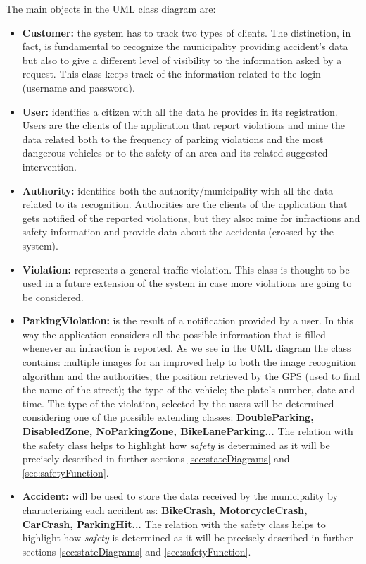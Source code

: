 	The main objects in the UML class diagram are:
	\begin{itemize}
		\item \textbf{Customer:} the system has to track two types of clients. The distinction, in fact, is fundamental to recognize the municipality providing accident's data but also to give a different level of visibility to the information asked by a request. This class keeps track of the information related to the login (username and password).
		
		\item \textbf{User:} identifies a citizen with all the data he provides in its registration. Users are the clients of the application that report violations and mine the data related both to the frequency of parking violations and the most dangerous vehicles or to the safety of an area and its related suggested intervention.
		
		\item \textbf{Authority:} identifies both the authority/municipality with all the data related to its recognition. Authorities are the clients of the application that gets notified of the reported violations, but they also: mine for infractions and safety information and provide data about the accidents (crossed by the system).
		
		\item \textbf{Violation:} represents a general traffic violation. This class is thought to be used in a future extension of the system in case more violations are going to be considered.
		
		\item \textbf{ParkingViolation:} is the result of a notification provided by a user. In this way the application considers all the possible information that is filled whenever an infraction is reported. As we see in the UML diagram the class contains: multiple images for an improved help to both the image recognition algorithm and the authorities; the position retrieved by the GPS (used to find the name of the street); the type of the vehicle; the plate's number, date and time. The type of the violation, selected by the users will be determined considering one of the possible extending classes: \textbf{DoubleParking, DisabledZone, NoParkingZone, BikeLaneParking...} The relation with the safety class helps to highlight how \emph{safety} is determined as it will be precisely described in further sections \ref{sec:stateDiagrams} and \ref{sec:safetyFunction}.
		
		\item \textbf{Accident:} will be used to store the data received by the municipality by characterizing each accident as: \textbf{BikeCrash, MotorcycleCrash, CarCrash, ParkingHit...} The relation with the safety class helps to highlight how \emph{safety} is determined as it will be precisely described in further sections \ref{sec:stateDiagrams} and \ref{sec:safetyFunction}.
		

\end{itemize}
